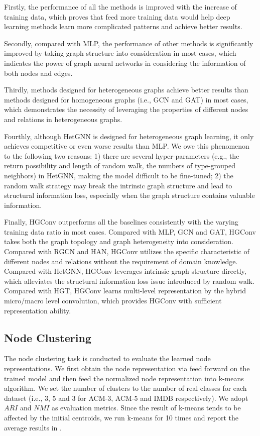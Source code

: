 Firstly, the performance of all the methods is improved with the increase of training data, which proves that feed more training data would help deep learning methods learn more complicated patterns and achieve better results.

Secondly, compared with MLP, the performance of other methods is significantly improved by taking graph structure into consideration in most cases, which indicates the power of graph neural networks in considering the information of both nodes and edges. 

Thirdly, methods designed for heterogeneous graphs achieve better results than methods designed for homogeneous graphs (i.e., GCN and GAT) in most cases, which demonstrates the necessity of leveraging the properties of different nodes and relations in heterogeneous graphs.

Fourthly, although HetGNN is designed for heterogeneous graph learning, it only achieves competitive or even worse results than MLP. We owe this phenomenon to the following two reasons: 1) there are several hyper-parameters (e.g., the return possibility and length of random walk, the numbers of type-grouped neighbors) in HetGNN, making the model difficult to be fine-tuned; 2) the random walk strategy may break the intrinsic graph structure and lead to structural information loss, especially when the graph structure contains valuable information.

Finally, HGConv outperforms all the baselines consistently with the varying training data ratio in most cases. Compared with MLP, GCN and GAT, HGConv takes both the graph topology and graph heterogeneity into consideration. Compared with RGCN and HAN, HGConv utilizes the specific characteristic of different nodes and relations without the requirement of domain knowledge. Compared with HetGNN, HGConv leverages intrinsic graph structure directly, which alleviates the structural information loss issue introduced by random walk. Compared with HGT, HGConv learns multi-level representation by the hybrid micro/macro level convolution, which provides HGConv with sufficient representation ability.

\subsection{Node Clustering}
The node clustering task is conducted to evaluate the learned node representations. We first obtain the node representation via feed forward on the trained model and then feed the normalized node representation into k-means algorithm. We set the number of clusters to the number of real classes for each dataset (i.e., 3, 5 and 3 for ACM-3, ACM-5 and IMDB respectively). We adopt $ARI$ and $NMI$ as evaluation metrics. Since the result of k-means tends to be affected by the initial centroids, we run k-means for 10 times and report the average results in .

